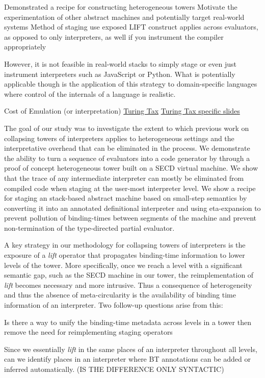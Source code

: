 \documentclass[fleqn]{article}
\theoremstyle{definition}
\begin{document}
Demonstrated a recipe for constructing heterogeneous towers
Motivate the experimentation of other abstract machines and potentially target real-world systems
Method of staging use exposed LIFT construct applies across evaluators, as opposed to only interpreters, as well if you instrument the compiler appropriately

However, it is not feasible in real-world stacks to simply stage or even just instrument interpreters such as JavaScript or Python. What is potentially applicable though is the application of this strategy to domain-specific languages where control of the internals of a language is realistic.

Cost of Emulation (or interpretation)
\cite{steil2004dynamic}
\href{http://materials.dagstuhl.de/files/17/17061/17061.PaulH.J.Kelly.Slides.pdf}{Turing Tax}
\href{https://www.doc.ic.ac.uk/~phjk/AdvancedCompArchitecture/Lectures/pdfs/Ch01-TuringTaxDiscussionV02.pdf}{Turing Tax specific slides}

The goal of our study was to investigate the extent to which previous work on collapsing towers of interpreters applies to heterogeneous settings and the interpretative overhead that can be eliminated in the process. We demonstrate the ability to turn a sequence of evaluators into a code generator by through a proof of concept heterogeneous tower built on a SECD virtual machine. We show that the trace of any intermediate interpreter can mostly be eliminated from compiled code when staging at the user-most interpreter level. We show a recipe for staging an stack-based abstract machine based on small-step semantics by converting it into an annotated definitional interpreter and using eta-expansion to prevent pollution of binding-times between segments of the machine and prevent non-termination of the type-directed partial evaluator.

A key strategy in our methodology for collapsing towers of interpreters is the exposure of a \textit{lift} operator that propagates binding-time information to lower levels of the tower. More specifically, once we reach a level with a significant semantic gap, such as the SECD machine in our tower, the reimplementation of \textit{lift} becomes necessary and more intrusive. Thus a consequence of heterogeneity and thus the absence of meta-circularity is the availability of binding time information of an interpreter. Two follow-up questions arise from this:
\begin{enumerate*}
	\item Is there a way to unify the binding-time metadata across levels in a tower then remove the need for reimplementing staging operators
	\item Since we essentially \textit{lift} in the same places of an interpreter throughout all levels, can we identify places in an interpreter where BT annotations can be added or inferred automatically. (IS THE DIFFERENCE ONLY SYNTACTIC)
\end{enumerate*}
\end{document}
